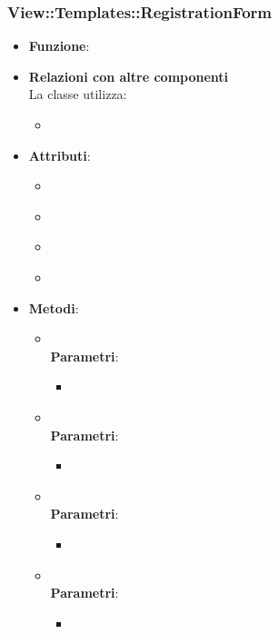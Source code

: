 \subsubsection{View::Templates::RegistrationForm}
\begin{itemize}
\item\textbf{Funzione}:
\item\textbf{Relazioni con altre componenti}\\
La classe utilizza:
	\begin{itemize}
		\item
	\end{itemize}
\item\textbf{Attributi}:
	\begin{itemize}
		\item\code{}\\
		\item\code{}\\
		\item\code{}\\
		\item\code{}\\
	\end{itemize}
\item\textbf{Metodi}:
	\begin{itemize}
		\item\code{}\\
		\textbf{Parametri}:
			\begin{itemize}
				\item\code{}\\
			\end{itemize}
		\item\code{}\\
		\textbf{Parametri}:
			\begin{itemize}
				\item\code{}\\
			\end{itemize}
		\item\code{}\\
		\textbf{Parametri}:
			\begin{itemize}
				\item\code{}\\
			\end{itemize}
		\item\code{}\\
		\textbf{Parametri}:
			\begin{itemize}
				\item\code{}\\
			\end{itemize}
	\end{itemize}
\end{itemize}

